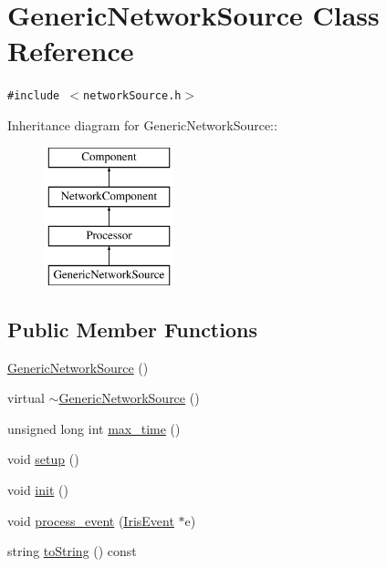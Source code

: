 \hypertarget{classGenericNetworkSource}{
\section{GenericNetworkSource Class Reference}
\label{classGenericNetworkSource}
}
{\tt \#include $<$networkSource.h$>$}

Inheritance diagram for GenericNetworkSource::\begin{figure}[H]
\begin{center}
\leavevmode
\includegraphics[height=4cm]{classGenericNetworkSource}
\end{center}
\end{figure}
\subsection*{Public Member Functions}
\begin{CompactItemize}
\item 
\hyperlink{classGenericNetworkSource_66fa04f8ab4c8ac70192f63249f8b387}{GenericNetworkSource} ()
\item 
virtual \hyperlink{classGenericNetworkSource_de83e8c46d7c400be8bdd2cf1e33d765}{$\sim$GenericNetworkSource} ()
\item 
unsigned long int \hyperlink{classGenericNetworkSource_a1970b5e7d100e15d282f03358c8ce70}{max\_\-time} ()
\item 
void \hyperlink{classGenericNetworkSource_a1390d4685120020d9b9564ee19df854}{setup} ()
\item 
void \hyperlink{classGenericNetworkSource_e875a5cd3f60bd3073812f747c80409e}{init} ()
\item 
void \hyperlink{classGenericNetworkSource_a67be5ac0f97b7e0b38eba909cecaa64}{process\_\-event} (\hyperlink{classIrisEvent}{IrisEvent} $\ast$e)
\item 
string \hyperlink{classGenericNetworkSource_8d8c0760eb634da3ccc3d4083e9415b9}{toString} () const 
\end{CompactItemize}
